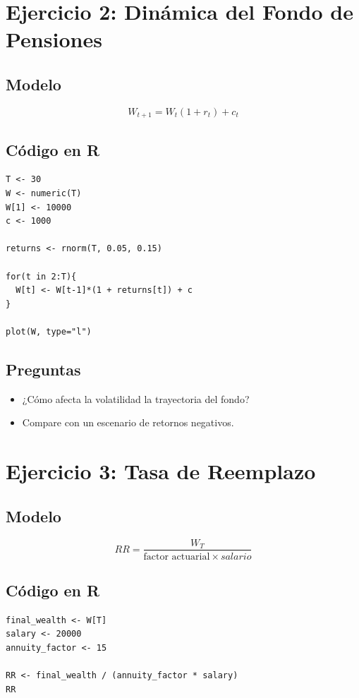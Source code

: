 \documentclass[12pt]{article}
\begin{document}
\section{Ejercicio 2: Dinámica del Fondo de Pensiones}

\subsection{Modelo}
\begin{equation}
W_{t+1} = W_t (1 + r_t) + c_t
\end{equation}

\subsection{Código en R}
\begin{verbatim}
T <- 30
W <- numeric(T)
W[1] <- 10000
c <- 1000

returns <- rnorm(T, 0.05, 0.15)

for(t in 2:T){
  W[t] <- W[t-1]*(1 + returns[t]) + c
}

plot(W, type="l")
\end{verbatim}

\subsection{Preguntas}
\begin{itemize}
\item ¿Cómo afecta la volatilidad la trayectoria del fondo?
\item Compare con un escenario de retornos negativos.
\end{itemize}

\section{Ejercicio 3: Tasa de Reemplazo}

\subsection{Modelo}
\begin{equation}
RR = \frac{W_T}{\text{factor actuarial} \times salario}
\end{equation}

\subsection{Código en R}
\begin{verbatim}
final_wealth <- W[T]
salary <- 20000
annuity_factor <- 15

RR <- final_wealth / (annuity_factor * salary)
RR
\end{verbatim}
\end{document}
